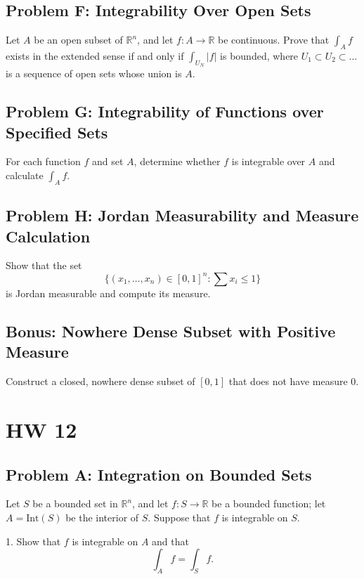 \documentclass[lang=cn,11pt]{template}
\begin{document}
\section*{Problem F: Integrability Over Open Sets}
Let \( A \) be an open subset of \( \mathbb{R}^n \), and let \( f : A \rightarrow \mathbb{R} \) be continuous. Prove that \( \int_A f \) exists in the extended sense if and only if \( \int_{U_N} |f| \) is bounded, where \( U_1 \subset U_2 \subset \dots \) is a sequence of open sets whose union is \( A \).

\section*{Problem G: Integrability of Functions over Specified Sets}
For each function \( f \) and set \( A \), determine whether \( f \) is integrable over \( A \) and calculate \( \int_A f \).

\section*{Problem H: Jordan Measurability and Measure Calculation}
Show that the set 
\[
\{ (x_1, \dots, x_n) \in [0, 1]^n : \sum x_i \leq 1 \}
\]
is Jordan measurable and compute its measure.

\section*{Bonus: Nowhere Dense Subset with Positive Measure}
Construct a closed, nowhere dense subset of \([0,1]\) that does not have measure 0.








\chapter{HW 12}

\section*{Problem A: Integration on Bounded Sets}
Let \( S \) be a bounded set in \( \mathbb{R}^n \), and let \( f : S \rightarrow \mathbb{R} \) be a bounded function; let \( A = \text{Int}(S) \) be the interior of \( S \). Suppose that \( f \) is integrable on \( S \).

1. Show that \( f \) is integrable on \( A \) and that
   \[
   \int_A f = \int_S f.
   \]
\end{document}

